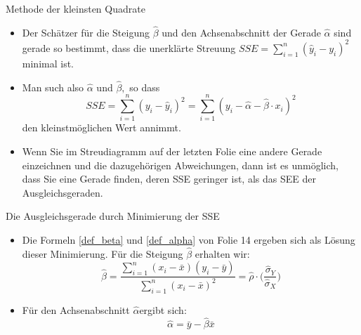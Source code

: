 \documentclass[usenames,dvipsnames,handout]{beamer}
\begin{document}
 \begin{frame}{Methode der kleinsten Quadrate}
 \begin{itemize}
 \item{Der Schätzer für die Steigung $\hat{\beta}$ und den Achsenabschnitt der Gerade $\hat{\alpha}$
 sind gerade so bestimmt, dass die unerklärte Streuung $SSE =\sum_{i=1}^{n}(\hat{y}_{i}-y_{i})^{2} $
 minimal ist.}\pause
 \item{Man such also $\hat{\alpha}$ und $\hat{\beta},$ so dass
 \begin{equation}
 SSE =\sum_{i=1}^{n}(y_{i}-\hat{y}_{i})^{2}  = \sum_{i=1}^{n}(y_{i}-\hat{\alpha}-\hat{\beta}\cdot x_{i})^{2} %
 \end{equation}
 den kleinstmöglichen Wert annimmt.
 }\pause
 \item{Wenn Sie im Streudiagramm auf der letzten Folie eine andere Gerade einzeichnen und die dazugehörigen
 Abweichungen, dann ist es unmöglich, dass Sie eine Gerade finden, deren SSE geringer ist, als das SEE
 der Ausgleichsgeraden.}
 \end{itemize}

 \end{frame}
 
 \begin{frame}{Die Ausgleichsgerade durch Minimierung
 der SSE}
 \begin{itemize}
\item{Die Formeln \eqref{def_beta} und \eqref{def_alpha} von Folie
14 ergeben sich als Lösung dieser Minimierung. Für die Steigung 
$\hat{\beta}$ erhalten wir:
 \begin{equation}
 \hat{\beta}=\frac{\sum_{i=1}^{n} (x_{i}-\bar{x}) (y_{i}-\bar{y})}{
 \sum_{i=1}^{n} (x_{i}-\bar{x})^{2}}=\hat{\rho}\cdot \bigg(\frac{\hat{\sigma}_{Y}}{\hat{\sigma}_{X}}\bigg)
 \end{equation}
}
 \item{Für den Achsenabschnitt $\hat{\alpha}$ergibt sich:
 $$
 \hat{\alpha}=\bar{y}-\hat{\beta}\bar{x}
$$
 }
\end{itemize}
 
 \end{frame}
\end{document}
